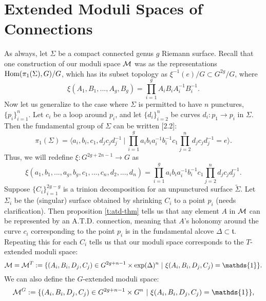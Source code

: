 	
	
	\section{Extended Moduli Spaces of Connections}
	As always, let $\Sigma$ be a compact connected genus $g$ Riemann surface. Recall that one construction of our moduli space $\mathcal{M}$ was as the representations $\text{Hom}(\pi_1(\Sigma),G)/G$, which has its subset topology as $\xi^{-1}(e)/G \subset G^{2g}/G$, where 
	\begin{equation}
		\xi(A_1,B_1,...,A_g,B_g) = \prod_{i=1}^g A_iB_iA_i^{-1}B_i^{-1}.
	\end{equation} 
	Now let us generalize to the case where $\Sigma$ is permitted to have $n$ punctures, $\{p_i\}_{i=1}^n$. Let $c_i$ be a loop around $p_i$, and let $\{d_i\}_{i=2}^n$ be curves $d_i:p_1\to p_i$ in $\Sigma$. Then the fundamental group of $\Sigma$ can be written \cite{hurtubise_representations_2000}[2.2]:
	\begin{equation}
		\pi_1(\Sigma) = \langle a_i, b_i, c_1, d_jc_jd_j^{-1} ~|~ \prod_{i=1}^{g}a_ib_ia_i^{-1}b_i^{-1}c_1\prod_{j=2}^{n}d_jc_jd_j^{-1}=e\rangle.
	\end{equation}
	Thus, we will redefine $\xi:G^{2g+2n-1}\to G$ as
	\begin{equation}
		\xi(a_1,b_1,...,a_g,b_g,c_1,...,c_n,d_2,...,d_n) = \prod_{i=1}^{g}a_ib_ia_i^{-1}b_i^{-1}c_1\prod_{j=2}^{n}d_jc_jd_j^{-1}.
	\end{equation}
	Suppose $\{C_i\}_{i=1}^{2g-g}$ is a trinion decomposition for an unpunctured surface $\tilde{\Sigma}$. Let $\Sigma_i$ be the (singular) surface obtained by shrinking $C_i$ to a point $p_i$ (needs clarification). Then proposition \ref{t:atd-thm} tells us that any element $A$ in $\mathcal{M}$ can be represented by an A.T.D. connection, meaning that $A$'s holonomy around the curve $c_i$ corresponding to the point $p_i$ is in the fundamental alcove $\Delta\subset \mathfrak{t}$. Repeating this for each $C_i$ tells us that our moduli space corresponds to the $T$-extended moduli space:
	\begin{equation}
		\MM = \MM^T := \{(A_i,B_i,D_j,C_j)\in G^{2g+n-1}\times \exp(\Delta)^n ~|~ \xi(A_i,B_i,D_j,C_j) = \mathds{1}\}.
	\end{equation}
	We can also define the $G$-extended moduli space:
	\begin{equation}
	\MM^G := \{(A_i,B_i,D_j,C_j)\in G^{2g+n-1}\times G^n ~|~ \xi(A_i,B_i,D_j,C_j) = \mathds{1}\},
	\end{equation}
